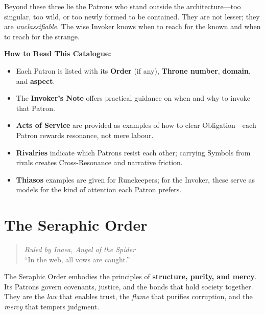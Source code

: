 \noindent
Beyond these three lie the Patrons who stand outside the architecture---too singular, too wild, or too newly formed to be contained. They are not lesser; they are \emph{unclassifiable}. The wise Invoker knows when to reach for the known and when to reach for the strange.

\vspace{1em}

\noindent
\textbf{How to Read This Catalogue:}
\begin{itemize}[leftmargin=1.5em]
  \item Each Patron is listed with its \textbf{Order} (if any), \textbf{Throne number}, \textbf{domain}, and \textbf{aspect}.
  \item The \textbf{Invoker's Note} offers practical guidance on when and why to invoke that Patron.
  \item \textbf{Acts of Service} are provided as examples of how to clear Obligation---each Patron rewards resonance, not mere labour.
  \item \textbf{Rivalries} indicate which Patrons resist each other; carrying Symbols from rivals creates Cross-Resonance and narrative friction.
  \item \textbf{Thiasos} examples are given for Runekeepers; for the Invoker, these serve as models for the kind of attention each Patron prefers.
\end{itemize}

\newpage


\section{The Seraphic Order}
\label{sec:seraphic-order}

\begin{quote}
\textit{Ruled by Inaea, Angel of the Spider} \\
``In the web, all vows are caught.''
\end{quote}

The Seraphic Order embodies the principles of \textbf{structure, purity, and mercy}. Its Patrons govern covenants, justice, and the bonds that hold society together. They are the \emph{law} that enables trust, the \emph{flame} that purifies corruption, and the \emph{mercy} that tempers judgment.


